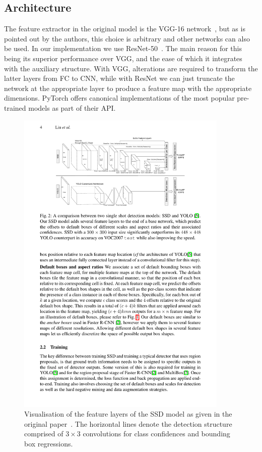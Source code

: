 \subsection*{Architecture}
The feature extractor in the original model is the VGG-16 network~\parencite{simonyan2015deep}, but as is pointed out by the authors, this choice is arbitrary and other networks can also be used.
In our implementation we use ResNet-50~\parencite{he2015deep}.
The main reason for this being its superior performance over VGG, and the ease of which it integrates with the auxiliary structure.
With VGG, alterations are required to transform the latter layers from FC to CNN, while with ResNet we can just truncate the network at the appropriate layer to produce a feature map with the appropriate dimensions.
PyTorch offers canonical implementations of the most popular pre-trained models as part of their API\@.

\begin{figure}[htb]
  \centering
  \includegraphics[width=0.9\textwidth]{figs/SSD_model.pdf}
  \caption[SSD architecture]{Visualisation of the feature layers of the SSD model as given in the original paper~\parencite{liu_ssd_2016}.
The horizontal lines denote the detection structure comprised of \(3\times 3\) convolutions for class confidences and bounding box regressions.}\label{fig:model}
\end{figure}

